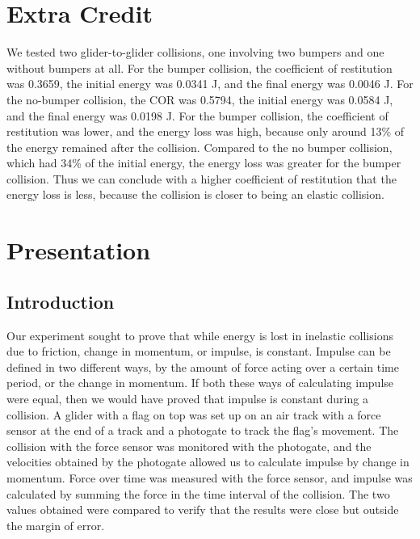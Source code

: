 \documentclass[11pt]{report}
\begin{document}
\section*{Extra Credit}
We tested two glider-to-glider collisions, one involving two bumpers and one
without bumpers at all.  For the bumper collision, the coefficient of
restitution was 0.3659, the initial energy was 0.0341 J, and the final energy
was 0.0046 J.  For the no-bumper collision, the COR was 0.5794, the initial
energy was 0.0584 J, and the final energy was 0.0198 J.  For the bumper
collision, the coefficient of restitution was lower, and the energy loss was
high, because only around 13\% of the energy remained after the collision.
Compared to the no bumper collision, which had 34\% of the initial energy,  
the energy loss was greater for the bumper collision.  Thus we can conclude with
a higher coefficient of restitution that the energy loss is less, because the
collision is closer to being an elastic collision.

\section*{Presentation}

\subsection*{Introduction}
Our experiment sought to prove that while energy is lost in inelastic collisions due to
friction, change in momentum, or impulse, is constant.  Impulse can be defined
in two different ways, by the amount of force acting over a certain time period,
or the change in momentum.
If both these ways of calculating impulse were equal, then we would have proved that impulse
is constant during a collision.  A glider with a flag on top was set up on an
air track with a force sensor at the end of a track and a photogate to track the
flag's movement.  The collision with the force sensor was monitored with the
photogate, and the velocities obtained by the photogate allowed us to calculate
impulse by change in momentum.  Force over time was measured with the force
sensor, and impulse was calculated by summing the force in the time interval of
the collision.  The two values obtained were compared to verify that the results
were close but outside the margin of error.
\end{document}
